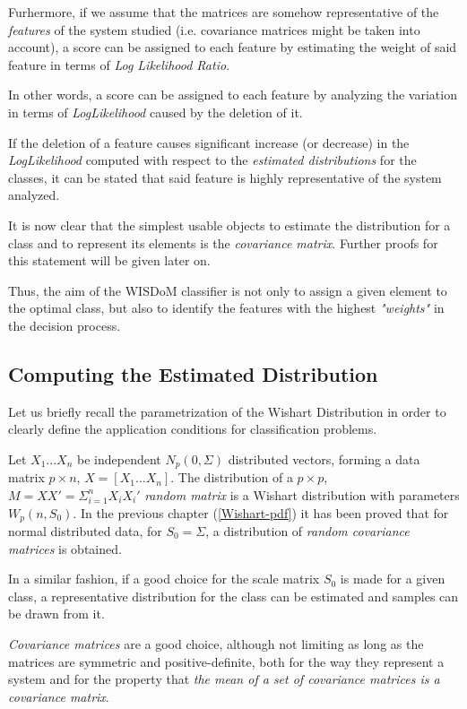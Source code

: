 \documentclass[12pt,openright,twoside,a4paper]{book}
\begin{document}
Furhermore, if we assume that the matrices are somehow representative of the \textit{features} of the system studied (i.e. covariance  matrices might be taken into account), a score can be assigned to each feature by estimating the weight of said feature in terms of \textit{Log Likelihood Ratio}.

In other words, a score can be assigned to each feature by analyzing the variation in terms of \textit{LogLikelihood} caused by the deletion of it. 

If the deletion of a feature causes significant increase (or decrease) in the \textit{LogLikelihood} computed with respect to the \textit{estimated distributions} for the classes, it can be stated that said feature is highly representative of the system analyzed.

It is now clear that the simplest usable objects to estimate the distribution for a class and to represent its elements is the \textit{covariance  matrix}. Further proofs for this statement will be given later on.

Thus, the aim of the WISDoM classifier is not only to assign a given element to the optimal class, but also to identify the features with the highest \textit{"weights"} in the decision process.

\subsection{Computing the Estimated Distribution}

Let us briefly recall the parametrization of the Wishart Distribution in order to clearly define the application conditions for classification problems.

Let $X_1...X_n$ be independent $N_p(0,\Sigma)$ distributed vectors, forming a data matrix $p\times n$, $X=[X_1...X_n]$.
The distribution of  a $p\times p$, $M=XX'=\Sigma^n_{i=1}X_iX_i'$ \textit{random matrix}  is a Wishart distribution with parameters $W_p (n, S_0 )$. In the previous chapter (\ref{Wishart-pdf}) it has been proved that for normal distributed data, for $S_0=\Sigma$, a distribution of \textit{random covariance matrices} is obtained.

In a similar fashion, if a good choice for the scale matrix $S_0$ is made for a given class, a representative distribution for the class can be estimated and samples can be drawn from it.

\textit{Covariance matrices} are a good choice, although not limiting as long as the matrices are symmetric and positive-definite, both for the way they represent a system and for the property that \textit{the mean of a set of covariance matrices is a covariance matrix}. 
\end{document}
